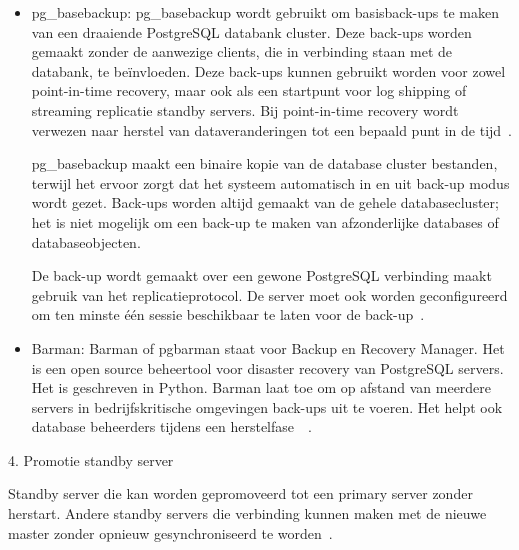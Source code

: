 \begin{itemize}
    \item pg\_basebackup: pg\_basebackup wordt gebruikt om basisback-ups te maken van een draaiende PostgreSQL databank cluster. Deze back-ups worden gemaakt zonder de aanwezige clients, die in verbinding staan met de databank, te beïnvloeden. Deze back-ups kunnen gebruikt worden voor zowel point-in-time recovery, maar ook als een startpunt voor log shipping of streaming replicatie standby servers. Bij point-in-time recovery wordt verwezen naar herstel van dataveranderingen tot een bepaald punt in de tijd~\autocite{MySQL2021}. %
    
    pg\_basebackup maakt een binaire kopie van de database cluster bestanden, terwijl het ervoor zorgt dat het systeem automatisch in en uit back-up modus wordt gezet. Back-ups worden altijd gemaakt van de gehele databasecluster; het is niet mogelijk om een back-up te maken van afzonderlijke databases of databaseobjecten. 
    
    De back-up wordt gemaakt over een gewone PostgreSQL verbinding maakt gebruik van het replicatieprotocol. De server moet ook worden geconfigureerd om ten minste één sessie beschikbaar te laten voor de back-up~\autocite{PostgreSQL2021c}. %
    \newline
    \item Barman: Barman of pgbarman staat voor Backup en Recovery Manager. Het is een open source beheertool voor disaster recovery van PostgreSQL servers. Het is geschreven in Python. Barman laat toe om op afstand van meerdere servers in bedrijfskritische omgevingen back-ups uit te voeren. Het helpt ook database beheerders tijdens een herstelfase~\autocite{Barman2020}~\autocite{Barman2020a}. %
\end{itemize}


4. Promotie standby server

Standby server die kan worden gepromoveerd tot een primary server zonder herstart. Andere standby servers die verbinding kunnen maken met de nieuwe master zonder opnieuw gesynchroniseerd te worden~\autocite{2020a}.

